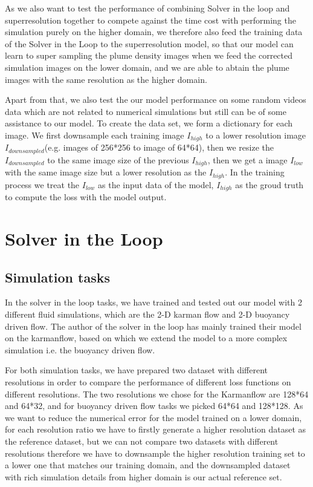 \documentclass[a4paper,12pt,twoside]{report}
\begin{document}
As we also want to test the performance of combining Solver in the loop and superresolution together to compete against the time cost with performing the simulation purely on the higher domain, we therefore also feed the training data of the Solver in the Loop to the superresolution model, so that our model can learn to super sampling the plume density images when we feed the corrected simulation images on the lower domain, and we are able to abtain the plume images with the same resolution as the higher domain.

Apart from that, we also test the our model performance on some random videos data which are not related to numerical simulations but still can be of some assistance to our model.
To create the data set, we form a dictionary for each image. We first downsample each training image $I_{high}$ to a lower resolution image $I_{downsampled}$(e.g. images of 256*256 to image of 64*64), then we resize the $I_{downsampled}$ to the same image size of the previous $I_{high}$, then we get a image $I_{low}$ with the same image size but a lower resolution as the $I_{high}$. In the training process we treat the $I_{low}$ as the input data of the model, $I_{high}$ as the groud truth to compute the loss with the model output.
\section{Solver in the Loop}
\subsection{Simulation tasks}
In the solver in the loop tasks, we have trained and tested out our model with 2 different fluid simulations, which are the 2-D karman flow and 2-D buoyancy driven flow. The author of the solver in the loop has mainly trained their model on the karmanflow, based on which we extend the model to a more complex simulation i.e. the buoyancy driven flow. 

For both simulation tasks, we have prepared two dataset with different resolutions in order to compare the performance of different loss functions on different resolutions. The two resolutions we chose for the Karmanflow are 128*64 and 64*32, and for buoyancy driven flow tasks we picked 64*64 and 128*128. As we want to reduce the numerical error for the model trained on a lower domain, for each resolution ratio we have to firstly generate a higher resolution dataset as the reference dataset, but we can not compare two datasets with different resolutions therefore we have to downsample the higher resolution training set to a lower one that matches our training domain, and the downsampled dataset with rich simulation details from higher domain is our actual reference set.
\end{document}
